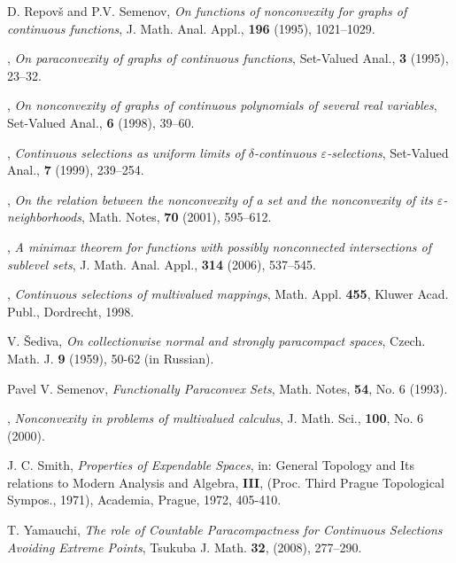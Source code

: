 \documentclass[12pt,a4paper,fleqn,leqno]{amsart}
\theoremstyle{plain}
\theoremstyle{definition}
\numberwithin{equation}{section}
\begin{document}
\begin{thebibliography}{1}
D. Repov\v{s} and P.V. Semenov, \emph{On functions of nonconvexity for graphs
of continuous functions}, J. Math. Anal. Appl., \textbf{196} (1995), 1021--1029.

\bysame, \emph{On paraconvexity of graphs of continuous functions}, Set-Valued Anal., \textbf{3} (1995), 23--32.

\bysame, \emph{On nonconvexity of graphs of continuous polynomials of several
real variables}, Set-Valued Anal., \textbf{6} (1998), 39--60.

\bysame, \emph{Continuous selections as uniform limits of $\delta$-continuous
$\varepsilon$-selections}, Set-Valued Anal., \textbf{7} (1999), 239--254.

\bysame, \emph{On the relation between the nonconvexity  of a set and the
nonconvexity of its $\varepsilon$-neighborhoods}, Math. Notes, \textbf{70}
(2001), 595--612.

\bysame, \emph{A minimax theorem for functions with possibly nonconnected
intersections of sublevel sets}, J. Math. Anal. Appl., \textbf{314} (2006),
537--545.

\bysame, \emph{Continuous selections of multivalued mappings}, Math. Appl.
\textbf{455}, Kluwer Acad. Publ., Dordrecht, 1998.

V. \v{S}ediva, \emph{On collectionwise normal and strongly paracompact spaces},
Czech. Math. J. \textbf{9} (1959), 50-62 (in Russian).

Pavel V. Semenov, \emph{Functionally Paraconvex Sets}, Math. Notes,
\textbf{54}, No. 6 (1993).

\bysame, \emph{Nonconvexity in problems of multivalued calculus}, J. Math.
Sci., \textbf{100}, No. 6 (2000).

J. C. Smith, \emph{Properties of Expendable Spaces}, in: General
Topology and Its relations to Modern Analysis and Algebra,
\textbf{III}, (Proc. Third Prague Topological Sympos., 1971),
Academia, Prague, 1972, 405-410.

T. Yamauchi, \emph{The role of Countable Paracompactness for
Continuous Selections Avoiding Extreme Points}, Tsukuba J. Math.
\textbf{32}, (2008), 277--290.
\end{thebibliography}
\end{document}
